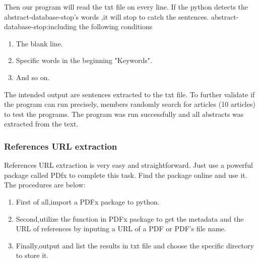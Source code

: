 	
	Then our program will read the txt file on every line.
	If the python detects the abstract-database-stop's words ,it will stop to catch the sentences.
	abstract-database-stop:including the following conditions
	
	\begin{enumerate}
			
		\item The blank line.
		\item Specific words in the beginning "Keywords".
		\item And so on.
					
	\end{enumerate}
	
	The intended output are sentences extracted to the txt file.
	To further validate if the program can run precisely, members randomly search for articles (10 articles) to test the programs.
	The program was run successfully and all abstracts was extracted from the text.
	 	
\subsubsection{References URL extraction}

References URL extraction is very easy and straightforward.
Just use a powerful package called PDfx to complete this task.
Find the package online and use it.
The procedures are below:

\begin{enumerate}
	
	\item First of all,import a PDFx package to python.
	\item Second,utilize the function in PDFx package to get the metadata and the URL of references by inputing a URL of a 
	PDF or PDF's file name.
	\item Finally,output and list the results in txt file and choose the specific directory to store it.

\end{enumerate}
 
